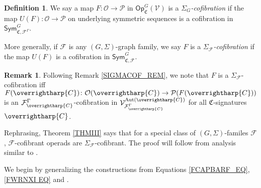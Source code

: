 \documentclass[a4paper,10pt
,draft
]{article}%
\numberwithin{equation}{section}
\numberwithin{figure}{section}
\theoremstyle{definition} %
\newtheorem{definition}[equation]{Definition}%
\newtheorem{example}[equation]{Example}%
\newtheorem{remark}[equation]{Remark}%
\newcommand{\vect}[1]{\text{\overrightharp{\ensuremath{#1}}}}
\newcommand{\Sym}{\ensuremath{\mathsf{Sym}}}%
\newcommand{\sSet}{\ensuremath{\mathsf{sSet}}}%
\newcommand{\Op}{\mathsf{Op}}%
\DeclareMathOperator{\Aut}{Aut}%
\newcommand{\F}{\ensuremath{\mathcal F}}
\newcommand{\V}{\ensuremath{\mathcal V}}
\renewcommand{\O}{\ensuremath{\mathcal O}}
\renewcommand{\P}{\ensuremath{\mathcal P}}
\newcommand{\1}{\ensuremath{\mathbbm 1}}%
\begin{document}
\begin{definition}
      We say a map $F \colon \O \to \P$ in $\Op^G_{\mathfrak C}(\V)$ is a \textit{$\Sigma_G$-cofibration} if
      the map $U(F) \colon \O \to \P$ on underlying symmetric sequences is a cofibration in $\Sym^G_{\mathfrak C, \F^\Gamma}$.
      
      More generally, if $\F$ is any $(G,\Sigma)$-graph family, we say $F$ is a \textit{$\Sigma_\F$-cofibration}
      if the map $U(F)$ is a cofibration in $\Sym^G_{\mathfrak C, \F}$.
\end{definition}

\begin{remark}
      Following Remark \ref{SIGMACOF_REM}, we note that 
      $F$ is a $\Sigma_\F$-cofibration iff 
      $F(\vect C)\colon \O(\vect C) \to \P(F(\vect C))$ is an $\mathcal F^\Gamma_{\vect C}$-cofibration in $\V^{\Aut(\vect C)}_{\F^\Gamma_{\vect  C}}$
      for all $\mathfrak C$-signatures $\vect C$.
\end{remark}     


Rephrasing, Theorem \ref{THMIII} says that for a special class of $(G,\Sigma)$-familes $\F$, $\F$-cofibrant operads are $\Sigma_\F$-cofibrant.
The proof will follow from analysis similar to \cite[\S 6]{BP_geo}.

We begin by generalizing the constructions from Equations \eqref{FCAPBARF_EQ}, \eqref{FWRNXI EQ} and \cite[6.13, 6.19, 6.37]{BP_geo}.
\end{document}
